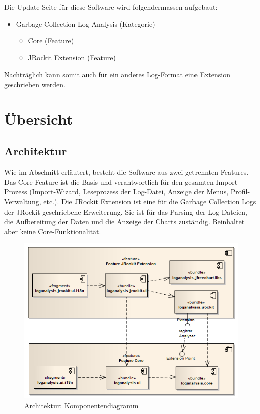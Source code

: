 Die Update-Seite für diese Software wird folgendermassen aufgebaut:
\begin{itemize}
	\item Garbage Collection Log Analysis (Kategorie)
		\begin{itemize}
			\item Core (Feature)
			\item JRockit Extension (Feature)
		\end{itemize}
\end{itemize}
Nachträglich kann somit auch für ein anderes Log-Format eine Extension geschrieben werden.


\section{Übersicht}
\subsection{Architektur}
Wie im Abschnitt  erläutert, besteht die Software aus zwei getrennten Features. Das Core-Feature ist die Basis und verantwortlich für den gesamten Import-Prozess (Import-Wizard, Leseprozess der Log-Datei, Anzeige der Menus, Profil-Verwaltung, etc.). Die JRockit Extension ist eine für die Garbage Collection Logs der JRockit geschriebene Erweiterung. Sie ist für das Parsing der Log-Dateien, die Aufbereitung der Daten und die Anzeige der Charts zuständig. Beinhaltet aber keine Core-Funktionalität.
 \begin{figure}[H]
  	\centering
        	\caption{Architektur: Komponentendiagramm}
    	\includegraphics[width=15cm]{images/architektur_komponenten_uebersicht}
\end{figure}

